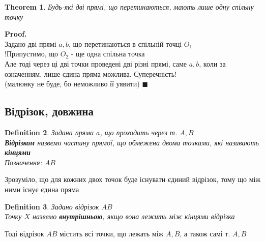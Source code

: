 \documentclass[a4paper, 14pt]{extarticle}
\theoremstyle{theoremdd}
\newtheorem{theorem}{Theorem}[subsection]
\theoremstyle{theoremdd}
\newtheorem{definition}[theorem]{Definition}
\theoremstyle{theoremdd}
\theoremstyle{theoremdd}
\theoremstyle{theoremdd}
\theoremstyle{theoremdd}
\theoremstyle{theoremdd}
\theoremstyle{theoremdd}
\newenvironment{pf}{\vspace*{-3mm} \textbf{Proof. \\}}{$\blacksquare$}
\begin{document}
\begin{theorem}
Будь-які дві прямі, що перетинаються, мають лише одну спільну точку
\end{theorem}

\begin{pf}
Задано дві прямі $a,b$, що перетинаються в спільній точці $O_1$\\
!Припустимо, що $O_2$ - ще одна спільна точка \\
Але тоді через ці дві точки проведені дві різні прямі, саме $a,b$, коли за означенням, лише єдина пряма можлива. Суперечність!\\
(малюнку не буде, бо неможливо її уявити)
\end{pf}

\subsection{Відрізок, довжина}
\begin{definition}
Задана пряма $a$, що проходить через т. $A,B$\\
\textbf{Відрізком} назвемо частину прямої, що обмежена двома точками, які називають \textbf{кінцями}\\
Позначення: $AB$
\begin{figure}[H]
\centering
{}
\end{figure}
\end{definition}
Зрозуміло, що для кожних двох точок буде існувати єдиний відрізок, тому що між ними існує єдина пряма

\begin{definition}
Задано відрізок $AB$\\
Точку $X$ назвемо \textbf{внутрішньою}, якщо вона лежить між кінцями відрізка
\begin{figure}[H]
\centering
{}
\end{figure}
\end{definition}
Тоді відрізок $AB$ містить всі точки, що лежать між $A,B$, а також самі т. $A,B$
\end{document}
